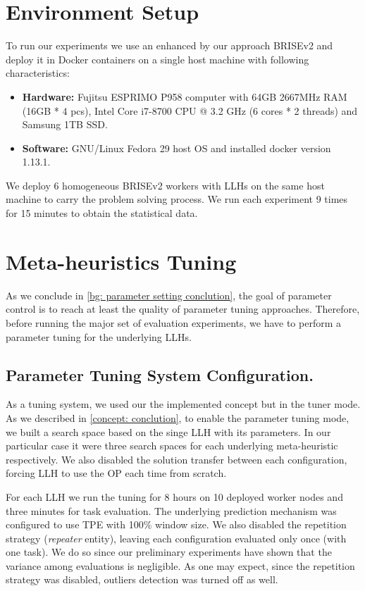 \section{Environment Setup}\label{eval: environment}
To run our experiments we use an enhanced by our approach BRISEv2 and deploy it in Docker containers on a single host machine with following characteristics:
\begin{itemize}
	\item \textbf{Hardware:} Fujitsu ESPRIMO P958 computer with 64GB 2667MHz RAM (16GB * 4 pcs), Intel Core i7-8700 CPU @ 3.2 GHz (6 cores * 2 threads) and Samsung 1TB SSD.
	
	\item \textbf{Software:} GNU/Linux Fedora 29 host OS and installed docker version 1.13.1.
\end{itemize}

We deploy 6 homogeneous BRISEv2 workers with LLHs on the same host machine to carry the problem solving process.
We run each experiment 9 times for 15 minutes to obtain the statistical data.


\section{Meta-heuristics Tuning}\label{eval: mh tuning}
As we conclude in \cref{bg: parameter setting conclution}, the goal of parameter control is to reach at least the quality of parameter tuning approaches. Therefore, before running the major set of evaluation experiments, we have to perform a parameter tuning for the underlying LLHs.

\subsection{Parameter Tuning System Configuration.} 
As a tuning system, we used our the implemented concept but in the tuner mode. As we described in \cref{concept: conclution}, to enable the parameter tuning mode, we built a search space based on the singe LLH with its parameters. In our particular case it were three search spaces for each underlying meta-heuristic respectively. We also disabled the solution transfer between each configuration, forcing LLH to use the OP each time from scratch.

For each LLH we run the tuning for 8 hours on 10 deployed worker nodes and three minutes for task evaluation. The underlying prediction mechanism was configured to use TPE with 100\% window size. We also disabled the repetition strategy (\emph{repeater} entity), leaving each configuration evaluated only once (with one task). We do so since our preliminary experiments have shown that the variance among evaluations is negligible. As one may expect, since the repetition strategy was disabled, outliers detection was turned off as well.

